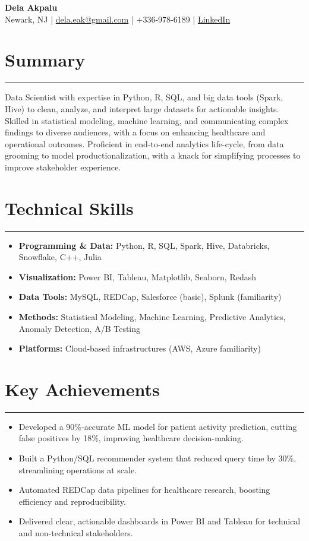 \documentclass[a4paper,11pt]{article}
\begin{document}
\begin{center}
    {\LARGE \textbf{Dela Akpalu}}\\
    Newark, NJ | \href{mailto:dela.eak@gmail.com}{dela.eak@gmail.com} | +336-978-6189 | \href{https://linkedin.com/in/edakpalu}{LinkedIn}
\end{center}

\section*{Summary}
\hrule \vspace{3mm}
Data Scientist with expertise in Python, R, SQL, and big data tools (Spark, Hive) to clean, analyze, and interpret large datasets for actionable insights. Skilled in statistical modeling, machine learning, and communicating complex findings to diverse audiences, with a focus on enhancing healthcare and operational outcomes. Proficient in end-to-end analytics life-cycle, from data grooming to model productionalization, with a knack for simplifying processes to improve stakeholder experience.

\section*{Technical Skills}
\hrule \vspace{2mm}
\begin{itemize}
    \item \textbf{Programming \& Data:} Python, R, SQL, Spark, Hive, Databricks, Snowflake, C++, Julia
    \item \textbf{Visualization:} Power BI, Tableau, Matplotlib, Seaborn, Redash
    \item \textbf{Data Tools:} MySQL, REDCap, Salesforce (basic), Splunk (familiarity)
    \item \textbf{Methods:} Statistical Modeling, Machine Learning, Predictive Analytics, Anomaly Detection, A/B Testing
    \item \textbf{Platforms:} Cloud-based infrastructures (AWS, Azure familiarity)
\end{itemize}

\section*{Key Achievements}
\hrule \vspace{2mm}
\begin{itemize}
    \item Developed a 90\%-accurate ML model for patient activity prediction, cutting false positives by 18\%, improving healthcare decision-making.
    \item Built a Python/SQL recommender system that reduced query time by 30\%, streamlining operations at scale.
    \item Automated REDCap data pipelines for healthcare research, boosting efficiency and reproducibility.
    \item Delivered clear, actionable dashboards in Power BI and Tableau for technical and non-technical stakeholders.
\end{itemize}
\end{document}
